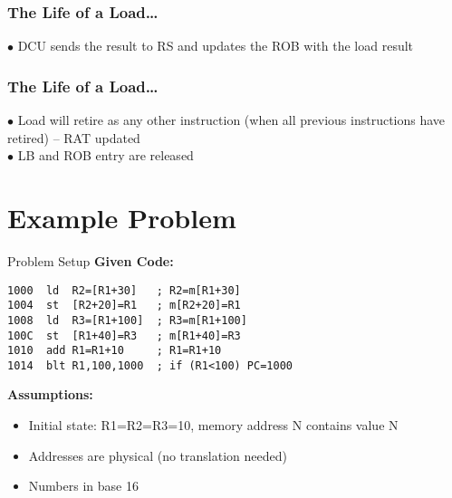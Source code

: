 \documentclass[aspectratio=169,12pt]{beamer}
\begin{document}
\begin{frame}
\frametitle{The Life of a Load\ldots}
\begin{center}
\LoadLifecycleDiagram[
    rat3={RF0},
    robNum={Ld},
    robValid={1},
    robRdy={1},
    robData={data},
    iq1={R3$\leftarrow$MEM(R2+50)},
    lbV={1},
    lbAddr={V(R2+50)},
    lbBC={0},
    arrows=4
]
\end{center}
\vspace{-3mm}
\scriptsize
$\bullet$ DCU sends the result to RS and updates the ROB with the load result
\end{frame}

\begin{frame}
\frametitle{The Life of a Load\ldots}
\begin{center}
\LoadLifecycleDiagram[
    iq1={R3$\leftarrow$MEM(R2+50)},
    lbV={1},
    lbAddr={V(R2+50)},
    lbBC={0},
    arrows=0
]
\end{center}
\vspace{-3mm}
\scriptsize
$\bullet$ Load will retire as any other instruction (when all previous instructions have retired) -- RAT updated\\
$\bullet$ LB and ROB entry are released
\end{frame}

\section{Example Problem}

\begin{frame}[fragile]{Problem Setup}
\textbf{Given Code:}
\begin{lstlisting}[basicstyle=\footnotesize\ttfamily]
1000  ld  R2=[R1+30]   ; R2=m[R1+30]
1004  st  [R2+20]=R1   ; m[R2+20]=R1
1008  ld  R3=[R1+100]  ; R3=m[R1+100]
100C  st  [R1+40]=R3   ; m[R1+40]=R3
1010  add R1=R1+10     ; R1=R1+10
1014  blt R1,100,1000  ; if (R1<100) PC=1000
\end{lstlisting}

\textbf{Assumptions:}
\begin{itemize}
    \item Initial state: R1=R2=R3=10, memory address N contains value N
    \item Addresses are physical (no translation needed)
    \item Numbers in base 16
\end{itemize}
\end{frame}
\end{document}

